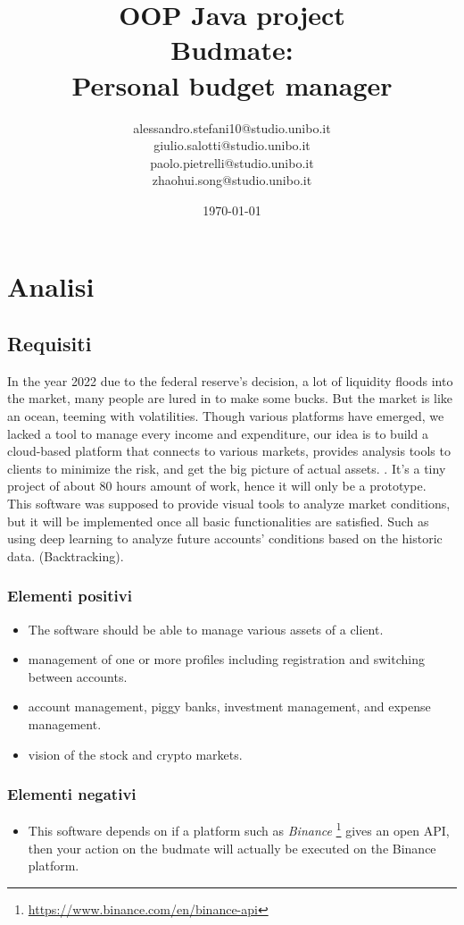 \documentclass[a4paper,12pt]{report}
\title{OOP Java project \\Budmate:\\ Personal budget manager}
\author{
    alessandro.stefani10@studio.unibo.it \\
    giulio.salotti@studio.unibo.it \\
    paolo.pietrelli@studio.unibo.it \\
    zhaohui.song@studio.unibo.it
}
\date{\today}
\begin{document}
\maketitle

\tableofcontents

\chapter{Analisi}

\section{Requisiti}

In the year 2022 due to the federal reserve's decision, a lot of liquidity floods into the market, many people are lured in to make some bucks.
But the market is like an ocean, teeming with volatilities. 
Though various platforms have emerged, we lacked a tool to manage every income and expenditure, our idea is to build a cloud-based platform that connects to various markets, provides analysis tools to clients to minimize the risk, and get the big picture of actual assets. .
It's a tiny project of about 80 hours amount of work, hence it will only be a prototype.
\\
This software was supposed to provide visual tools to analyze market conditions, but it will be implemented once all basic functionalities are satisfied.
%
Such as using deep learning to analyze future accounts' conditions based on the historic data. (Backtracking).

\subsection*{Elementi positivi}
\begin{itemize}
    \item The software should be able to manage various assets of a client.
    \item management of one or more profiles including registration and switching between accounts.
    \item account management, piggy banks, investment management, and expense management.
    \item vision of the stock and crypto markets.
\end{itemize}

\subsection*{Elementi negativi}
\begin{itemize}
    \item This software depends on if a platform such as \textit{Binance} \footnote{\url{https://www.binance.com/en/binance-api}} gives an open API, then your action on the budmate will actually be executed on the Binance platform.
\end{itemize}
\end{document}
